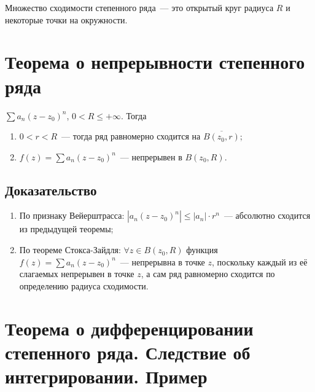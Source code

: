 \documentclass{article}
\begin{document}
            Множество сходимости степенного ряда~--- это открытый круг радиуса $R$ и некоторые точки на окружности.
            
    \newpage
    
    \section{Теорема о непрерывности степенного ряда}
    
        $\sum a_n(z - z_0)^n$, $0 < R \leqslant +\infty$. Тогда 
        
        \begin{enumerate}
        
            \item $0 < r < R$~--- тогда ряд равномерно сходится на $\overline{B(z_0, r)}$;
            
            \item $f(z) = \sum a_n (z - z_0)^n$~--- непрерывен в $B(z_0, R)$.
        
        \end{enumerate}
        
        \subsection{Доказательство}
        
            \begin{enumerate}
            
                \item По признаку Вейерштрасса: $\left| a_n (z - z_0)^n \right| \leqslant | a_n | \cdot r^n$~--- абсолютно сходится из предыдущей теоремы;
                
                \item По теореме Стокса-Зайдля: $\forall z \in B(z_0, R)$ функция $f(z) = \sum a_n (z - z_0)^n$~--- непрерывна в точке $z$, поскольку каждый из её слагаемых непрерывен в точке $z$, а сам ряд равномерно сходится по определению радиуса сходимости.
                
            \end{enumerate}
            
    \newpage
    
    \section{Теорема о дифференцировании степенного ряда. Следствие об интегрировании. Пример}
    
\end{document}
